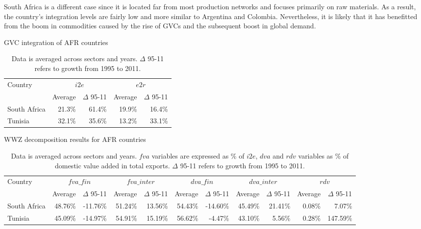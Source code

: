 \documentclass[11pt,a4paper]{article}
\begin{document}
South Africa is a different case since it is located far from most production networks and focuses primarily on raw materials. As a result, the country's integration levels are fairly low and more similar to Argentina and Colombia. Nevertheless, it is likely that it has benefitted from the boom in commodities caused by the rise of GVCs and the subsequent boost in global demand.

\begin{table}[htbp]\small
  \centering
  \caption{GVC integration of AFR countries}
    \begin{tabular}{lrrrr}
    \toprule
    Country & \multicolumn{2}{c}{\multirow{1}[0]{*}{$i2e$}} & \multicolumn{2}{c}{\multirow{1}[0]{*}{$e2r$}} \\
    \multicolumn{1}{c}{} & \multicolumn{1}{c}{Average} & \multicolumn{1}{c}{$\Delta$ 95-11} & \multicolumn{1}{c}{Average} & \multicolumn{1}{c}{$\Delta$ 95-11} \\
    \midrule
    South Africa & 21.3\% & 61.4\% & 19.9\% & 16.4\% \\
    Tunisia & 32.1\% & 35.6\% & 13.2\% & 33.1\% \\
\bottomrule
\end{tabular}
  \label{tab:afrgvc}
     \caption*{Data is averaged across sectors and years. $\Delta$ 95-11 refers to growth from 1995 to 2011.}
\end{table}

\begin{table}[htbp]\small
  \centering
  \caption{WWZ decomposition results for AFR countries}
  \hspace*{-2.7cm}
    \begin{tabular}{lrrrrrrrrrr} 
    \toprule
    \multicolumn{1}{l}{\multirow{1}[0]{*}{Country}} & \multicolumn{2}{c}{$fva\_fin$} & \multicolumn{2}{c}{$fva\_inter$} & \multicolumn{2}{c}{$dva\_fin$} & \multicolumn{2}{c}{$dva\_inter$} & \multicolumn{2}{c}{$rdv$} \\
    \multicolumn{1}{l}{} & \multicolumn{1}{c}{Average} & \multicolumn{1}{c}{$\Delta$ 95-11} &
\multicolumn{1}{c}{Average} & \multicolumn{1}{c}{$\Delta$ 95-11} & \multicolumn{1}{c}{Average} & \multicolumn{1}{c}{$\Delta$ 95-11} & \multicolumn{1}{c}{Average} & \multicolumn{1}{c}{$\Delta$ 95-11} & \multicolumn{1}{c}{Average} & \multicolumn{1}{c}{$\Delta$ 95-11} \\
  \midrule
South Africa & 48.76\% & -11.76\% & 51.24\% & 13.56\% & 54.43\% & -14.60\% & 45.49\% & 21.41\% & 0.08\% & 7.07\% \\
    Tunisia & 45.09\% & -14.97\% & 54.91\% & 15.19\% & 56.62\% & -4.47\% & 43.10\% & 5.56\% & 0.28\% & 147.59\% \\
\bottomrule
    \end{tabular}
  \label{tab:afrwwz}
     \caption*{Data is averaged across sectors and years. $fva$ variables are expressed as \% of $i2e$, $dva$ and $rdv$ variables as \% of domestic value added in total exports. $\Delta$ 95-11 refers to growth from 1995 to 2011.}
\end{table}
\end{document}
